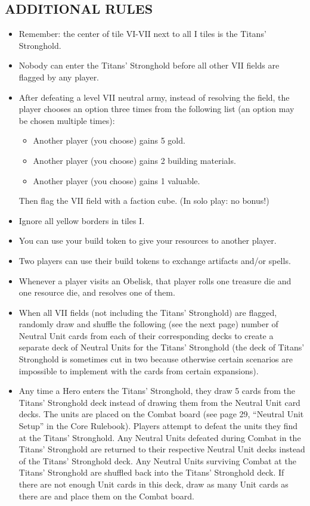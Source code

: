 \begin{multicols*}{2}
\subsection*{\MakeUppercase{Additional Rules}}
\begin{itemize}
  \item Remember: the center of tile VI-VII next to all I tiles is the Titans' Stronghold.
  \item Nobody can enter the Titans' Stronghold before all other VII fields are flagged by any player.
  \item After defeating a level VII neutral army, instead of resolving the field, the player chooses an option three times from the following list (an option may be chosen multiple times):
  \begin{itemize}
    \item Another player (you choose) gains 5 gold.
    \item Another player (you choose) gains 2 building materials.
    \item Another player (you choose) gains 1 valuable.
  \end{itemize}
  Then flag the VII field with a faction cube.
  (In solo play: no bonus!)
  \item Ignore all yellow borders in tiles I.
  \item You can use your build token to give your resources to another player.
  \item Two players can use their build tokens to exchange artifacts and/or spells.
  \item Whenever a player visits an Obelisk, that player rolls one treasure die and one resource die, and resolves one of them.
  \item When all VII fields (not including the Titans' Stronghold) are flagged, randomly draw and shuffle the following (see the next page) number of Neutral Unit cards from each of their corresponding decks to create a separate deck of Neutral Units for the Titans' Stronghold (the deck of Titans' Stronghold is sometimes cut in two because otherwise certain scenarios are impossible to implement with the cards from certain expansions).
  \item Any time a Hero enters the Titans' Stronghold, they draw 5 cards from the Titans' Stronghold deck instead of drawing them from the Neutral Unit card decks. The units are placed on the Combat board (see page 29, “Neutral Unit Setup” in the Core Rulebook). Players attempt to defeat the units they find at the Titans' Stronghold. Any Neutral Units defeated during Combat in the Titans' Stronghold are returned to their respective Neutral Unit decks instead of the Titans' Stronghold deck. Any Neutral Units surviving Combat at the Titans' Stronghold are shuffled back into the Titans' Stronghold deck. If there are not enough Unit cards in this deck, draw as many Unit cards as there are and place them on the Combat board.

\end{itemize}
\end{multicols*}
